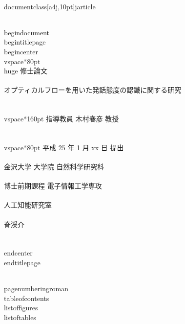 \\documentclass[a4j,10pt]{jarticle}
\begin{document}
\\begin{document}
\\begin{titlepage}
 \\begin{center}
  \\vspace*{80pt}
  {\\huge
  修士論文                                             \\\\
  オプティカルフローを用いた発話態度の認識に関する研究 \\\\
  \\vspace*{160pt}
  指導教員  木村春彦 教授                              \\\\
  \\vspace*{80pt}
  平成 25 年 1 月 xx 日 提出                          \\\\
  金沢大学 大学院 自然科学研究科                       \\\\
  博士前期課程 電子情報工学専攻                        \\\\
  人工知能研究室                                       \\\\
  脊渓介                                               \\\\
  }
 \\end{center}
\\end{titlepage}

\\pagenumbering{roman}
\\tableofcontents
\\listoffigures
\\listoftables

\
\
\
\
\

\
\

\
\

\
\end{document}
